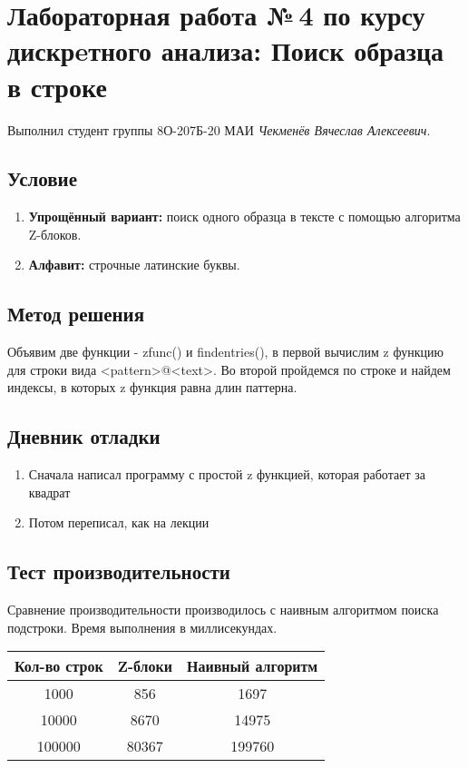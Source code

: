 \documentclass[12pt]{article}
\begin{document}
    
    \section*{Лабораторная работа №\,4 по курсу дискрeтного анализа: Поиск 
    образца в строке}

Выполнил студент группы 8О-207Б-20 МАИ \textit{Чекменёв Вячеслав Алексеевич}.

    \subsection*{Условие}

    \begin{enumerate}
        \item \textbf{Упрощённый вариант:} поиск одного образца в тексте с 
        помощью алгоритма Z-блоков.
        \item \textbf{Алфавит:} строчные латинские буквы.
    \end{enumerate}

    \subsection*{Метод решения}
    Объявим две функции - zfunc() и findentries(), в первой вычислим z функцию для строки вида <pattern>@<text>. Во второй пройдемся по строке и найдем индексы, в которых z функция равна длин паттерна.

    \subsection*{Дневник отладки}
    \begin{enumerate}
        \item Сначала написал программу с простой z функцией, которая работает за квадрат
        \item Потом переписал, как на лекции
    \end{enumerate}

    \subsection*{Тест производительности}
    Сравнение производительности производилось с наивным алгоритмом поиска 
    подстроки. Время выполнения в миллисекундах.
\\

    \begin{tabular}{ | c | c | c | }
        \hline
            Кол-во строк & Z-блоки & Наивный алгоритм \\ \hline
            1000 & 856 & 1697 \\
            10000 & 8670 & 14975 \\
            100000 & 80367 & 199760 \\
        \hline
    \end{tabular}
    
\end{document}
